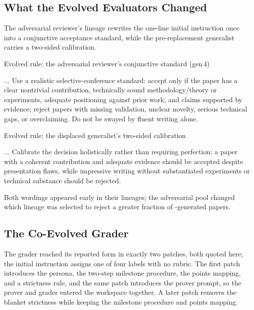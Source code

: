 \subsection{What the Evolved Evaluators Changed}
\label{app:evaluator-evolution:reviewer}

The adversarial reviewer's lineage rewrites the one-line initial instruction once into a conjunctive acceptance standard, while the pre-replacement generalist carries a two-sided calibration.

\begin{promptbox}{Evolved rule: the adversarial reviewer's conjunctive standard (gen\,4)}
\begin{PromptVerb}
... Use a realistic selective-conference standard: accept only if the
paper has a clear nontrivial contribution, technically sound
methodology/theory or experiments, adequate positioning against prior
work, and claims supported by evidence; reject papers with missing
validation, unclear novelty, serious technical gaps, or overclaiming.
Do not be swayed by fluent writing alone.
\end{PromptVerb}
\end{promptbox}

\begin{promptbox}{Evolved rule: the displaced generalist's two-sided calibration}
\begin{PromptVerb}
... Calibrate the decision holistically rather than requiring
perfection: a paper with a coherent contribution and adequate evidence
should be accepted despite presentation flaws, while impressive writing
without substantiated experiments or technical substance should be
rejected.
\end{PromptVerb}
\end{promptbox}

Both wordings appeared early in their lineages; the adversarial pool changed which lineage was selected to reject a greater fraction of \AI-generated papers.

\subsection{The Co-Evolved Grader}
\label{app:evaluator-evolution:grader}

The grader reached its reported form in exactly two patches, both quoted here; the initial instruction assigns one of four labels with no rubric. The first patch introduces the persona, the two-step milestone procedure, the points mapping, and a strictness rule, and the same patch introduces the prover prompt, so the prover and grader entered the workspace together. A later patch removes the blanket strictness while keeping the milestone procedure and points mapping.

